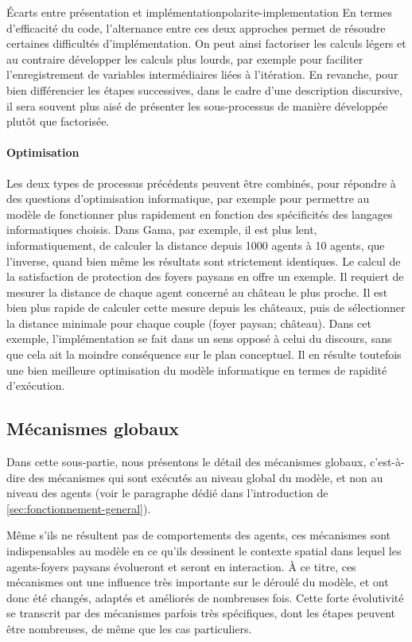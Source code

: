 \begin{encadre}{Écarts entre présentation et implémentation}{polarite-implementation}
En termes d'efficacité du code, l'alternance entre ces deux approches permet de résoudre certaines difficultés d'implémentation.
On peut ainsi factoriser les calculs légers et au contraire développer les calculs plus lourds, par exemple pour faciliter l'enregistrement de variables intermédiaires liées à l'itération. 
En revanche, pour bien différencier les étapes successives, dans le cadre d'une description discursive, il sera souvent plus aisé de présenter les sous-processus de manière développée plutôt que factorisée.

\paragraph{Optimisation} Les deux types de processus précédents peuvent être combinés, pour répondre à des questions d'optimisation informatique, par exemple pour permettre au modèle de fonctionner plus rapidement en fonction des spécificités des langages informatiques choisis.
Dans Gama, par exemple, il est plus lent, informatiquement, de calculer la distance depuis 1000 agents à 10 agents, que l'inverse, quand bien même les résultats sont strictement identiques.
Le calcul de la satisfaction de protection des foyers paysans en offre un exemple.
Il requiert de mesurer la distance de chaque agent concerné au château le plus proche.
Il est bien plus rapide de calculer cette mesure depuis les châteaux, puis de sélectionner la distance minimale pour chaque couple (foyer paysan; château).
Dans cet exemple, l'implémentation se fait dans un sens opposé à celui du discours, sans que cela ait la moindre conséquence sur le plan conceptuel.
Il en résulte toutefois une bien meilleure optimisation du modèle informatique en termes de rapidité d'exécution.
\end{encadre}

\subsection{Mécanismes globaux}

Dans cette sous-partie, nous présentons le détail des mécanismes \og globaux\fg{}, c'est-à-dire des mécanismes qui sont exécutés au niveau global du modèle, et non au niveau des agents (voir le paragraphe dédié dans l'introduction de \cref{sec:fonctionnement-general}).

Même s'ils ne résultent pas de comportements des agents, ces mécanismes sont indispensables au modèle en ce qu'ils dessinent le contexte spatial dans lequel les agents-foyers paysans évolueront et seront en interaction.
À ce titre, ces mécanismes ont une influence très importante sur le déroulé du modèle, et ont donc été changés, adaptés et améliorés de nombreuses fois.
Cette forte évolutivité se transcrit par des mécanismes parfois très spécifiques, dont les étapes peuvent être nombreuses, de même que les cas particuliers.

